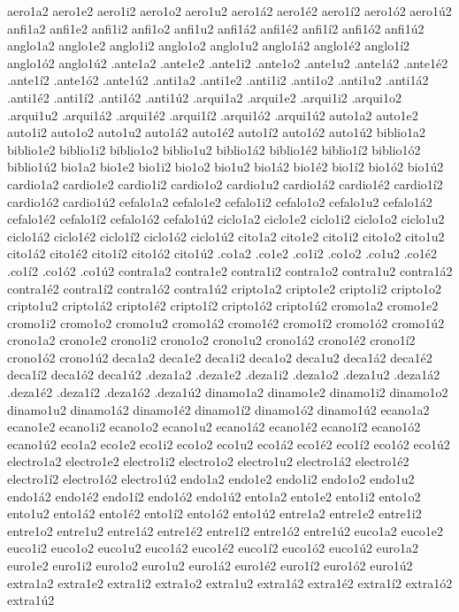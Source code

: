 {aero1a2 aero1e2 aero1i2 aero1o2 aero1u2 aero1á2 aero1é2 aero1í2 aero1ó2 aero1ú2
anfi1a2 anfi1e2 anfi1i2 anfi1o2 anfi1u2 anfi1á2 anfi1é2 anfi1í2 anfi1ó2 anfi1ú2
anglo1a2 anglo1e2 anglo1i2 anglo1o2 anglo1u2 anglo1á2 anglo1é2 anglo1í2 anglo1ó2 anglo1ú2
.ante1a2 .ante1e2 .ante1i2 .ante1o2 .ante1u2 .ante1á2 .ante1é2 .ante1í2 .ante1ó2 .ante1ú2
.anti1a2 .anti1e2 .anti1i2 .anti1o2 .anti1u2 .anti1á2 .anti1é2 .anti1í2 .anti1ó2 .anti1ú2
.arqui1a2 .arqui1e2 .arqui1i2 .arqui1o2 .arqui1u2 .arqui1á2 .arqui1é2 .arqui1í2 .arqui1ó2 .arqui1ú2
auto1a2 auto1e2 auto1i2 auto1o2 auto1u2 auto1á2 auto1é2 auto1í2 auto1ó2 auto1ú2
biblio1a2 biblio1e2 biblio1i2 biblio1o2 biblio1u2 biblio1á2 biblio1é2 biblio1í2 biblio1ó2 biblio1ú2
bio1a2 bio1e2 bio1i2 bio1o2 bio1u2 bio1á2 bio1é2 bio1í2 bio1ó2 bio1ú2
cardio1a2 cardio1e2 cardio1i2 cardio1o2 cardio1u2 cardio1á2 cardio1é2 cardio1í2 cardio1ó2 cardio1ú2
cefalo1a2 cefalo1e2 cefalo1i2 cefalo1o2 cefalo1u2 cefalo1á2 cefalo1é2 cefalo1í2 cefalo1ó2 cefalo1ú2
ciclo1a2 ciclo1e2 ciclo1i2 ciclo1o2 ciclo1u2 ciclo1á2 ciclo1é2 ciclo1í2 ciclo1ó2 ciclo1ú2
cito1a2 cito1e2 cito1i2 cito1o2 cito1u2 cito1á2 cito1é2 cito1í2 cito1ó2 cito1ú2
.co1a2 .co1e2 .co1i2 .co1o2 .co1u2         .co1é2 .co1í2 .co1ó2 .co1ú2
contra1a2 contra1e2 contra1i2 contra1o2 contra1u2 contra1á2 contra1é2 contra1í2 contra1ó2 contra1ú2
cripto1a2 cripto1e2 cripto1i2 cripto1o2 cripto1u2 cripto1á2 cripto1é2 cripto1í2 cripto1ó2 cripto1ú2
cromo1a2 cromo1e2 cromo1i2 cromo1o2 cromo1u2 cromo1á2 cromo1é2 cromo1í2 cromo1ó2 cromo1ú2
crono1a2 crono1e2 crono1i2 crono1o2 crono1u2 crono1á2 crono1é2 crono1í2 crono1ó2 crono1ú2
deca1a2 deca1e2 deca1i2 deca1o2 deca1u2 deca1á2 deca1é2 deca1í2 deca1ó2 deca1ú2
.deza1a2 .deza1e2 .deza1i2 .deza1o2 .deza1u2 .deza1á2 .deza1é2 .deza1í2 .deza1ó2 .deza1ú2
dinamo1a2 dinamo1e2 dinamo1i2 dinamo1o2 dinamo1u2 dinamo1á2 dinamo1é2 dinamo1í2 dinamo1ó2 dinamo1ú2
ecano1a2 ecano1e2 ecano1i2 ecano1o2 ecano1u2 ecano1á2 ecano1é2 ecano1í2 ecano1ó2 ecano1ú2
eco1a2 eco1e2 eco1i2 eco1o2 eco1u2 eco1á2 eco1é2 eco1í2 eco1ó2 eco1ú2
electro1a2 electro1e2 electro1i2 electro1o2 electro1u2 electro1á2 electro1é2 electro1í2 electro1ó2 electro1ú2
endo1a2 endo1e2 endo1i2 endo1o2 endo1u2 endo1á2 endo1é2 endo1í2 endo1ó2 endo1ú2
ento1a2 ento1e2 ento1i2 ento1o2 ento1u2 ento1á2 ento1é2 ento1í2 ento1ó2 ento1ú2
entre1a2 entre1e2 entre1i2 entre1o2 entre1u2 entre1á2 entre1é2 entre1í2 entre1ó2 entre1ú2
euco1a2 euco1e2 euco1i2 euco1o2 euco1u2 euco1á2 euco1é2 euco1í2 euco1ó2 euco1ú2
euro1a2 euro1e2 euro1i2 euro1o2 euro1u2 euro1á2 euro1é2 euro1í2 euro1ó2 euro1ú2
extra1a2 extra1e2 extra1i2 extra1o2 extra1u2 extra1á2 extra1é2 extra1í2 extra1ó2 extra1ú2
}
